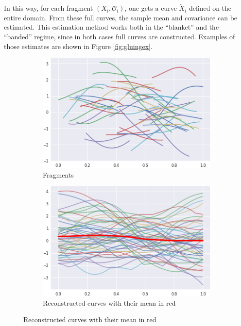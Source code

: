 \documentclass[10pt, a4paper]{report}
\theoremstyle{definition}
\theoremstyle{remark}
\begin{document}
In this way, for each fragment $(X_i, \mathcal{O}_i)$, one gets a curve $\tilde{X}_i$ defined on the entire domain. From these full curves, the sample mean and covariance can be estimated. This estimation method works both in the ``blanket'' and the ``banded'' regime, since in both cases full curves are constructed. Examples of those estimates are shown in Figure \ref{fig:gluingex}.\\
\begin{figure}[ht]
	\centering
	\begin{subfigure}{.4\textwidth}
		\centering
		\includegraphics[width=.8\linewidth]{Code/images/23/frags}
		\caption{Fragments}
	\end{subfigure}%
	\begin{subfigure}{.4\textwidth}
		\centering
		\includegraphics[width=.8\linewidth]{Code/images/23/extended}
		\caption{\centering Reconstructed curves with their mean in red}
	\end{subfigure}
	
	
	\medskip
	

\end{figure}
\end{document}
